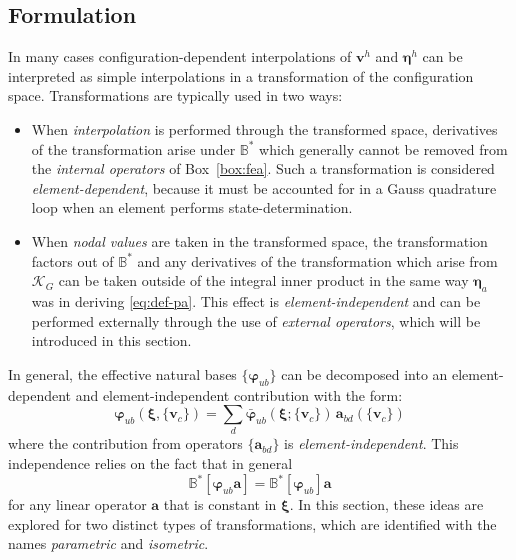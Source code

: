 \newcommand{\VarRigidTran}{{\dot{\bm{c}}_0}}
\newcommand{\VarConfig}{{\bm{v}}}

\subsection{Formulation}\label{sec:transformation}

In many cases configuration-dependent interpolations of \(\VarConfig^h\) and
\(\bm{\eta}^h\) can be interpreted as simple interpolations in a
transformation of the configuration space. Transformations are typically
used in two ways:

\begin{itemize}
\item
  When \emph{interpolation} is performed through the transformed space,
  derivatives of the transformation arise under \(\mathbb{B}^*\) 
  which generally cannot be removed from
  the \emph{internal operators} of Box~\ref{box:fea}. 
  Such a transformation is considered \emph{element-dependent},
  because it must be accounted for in a Gauss quadrature loop when an
  element performs state-determination.
\item
  When \emph{nodal values} are taken in the transformed space, the
  transformation factors out of \(\mathbb{B}^*\) and any derivatives of
  the transformation which arise from \(\mathcal{K}_G\) can be taken
  outside of the integral inner product in the same way \(\bm{\eta}_a\)
  was in deriving \eqref{eq:def-pa}. This effect is
  \emph{element-independent} and can be performed externally through the
  use of \emph{external operators}, which will be
  introduced in this section.
\end{itemize}

In general, the effective natural bases \(\{\bm{\varphi}_{u b}\}\) can
be decomposed into an element-dependent and element-independent
contribution with the form: %
\begin{equation*} 
\bm{\varphi}_{u b}(\bm{\xi}, \{\VarConfig_c\}) = \sum_d \bar{\bm{\varphi}}_{u b}\left(\bm{\xi}; \{\VarConfig_c\}\right) \, \mathbf{a}_{b d}\left(\{\VarConfig_c\}\right)
\end{equation*}
where the contribution from operators \(\{\mathbf{a}_{b d}\}\) is
\emph{element-independent}. This independence relies on the fact that in
general
\begin{equation}
  \mathbb{B}^*\left[\bm{\varphi}^{}_{u b}\mathbf{a}\right] = \mathbb{B}^*\left[\bm{\varphi}^{}_{u b}\right]\mathbf{a}
\label{eq:B-assoc}
\end{equation} 
for any linear operator \(\mathbf{a}\)
that is constant in \(\bm{\xi}\). In this section, these ideas are
explored for two distinct types of transformations, which are identified
with the names \emph{parametric} and \emph{isometric}.

